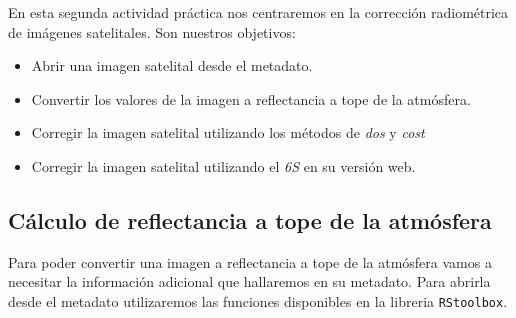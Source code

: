 
En esta segunda actividad pr\'actica nos centraremos en la correcci\'on radiom\'etrica
de im\'agenes satelitales. Son nuestros objetivos:

\begin{itemize}
    \item Abrir una imagen satelital desde el metadato.
    \item Convertir los valores de la imagen a reflectancia a tope de la
        atm\'osfera.
    \item Corregir la imagen satelital utilizando los m\'etodos de \emph{dos} y
        \emph{cost}
    \item Corregir la imagen satelital utilizando el \emph{6S} en su versi\'on web.
\end{itemize}

\subsection{C\'alculo de reflectancia a tope de la atm\'osfera}

Para poder convertir una imagen a reflectancia a tope de la atm\'osfera vamos a
necesitar la informaci\'on adicional que hallaremos en su metadato.
Para abrirla desde el metadato utilizaremos las funciones
disponibles en la libreria \texttt{RStoolbox}.

